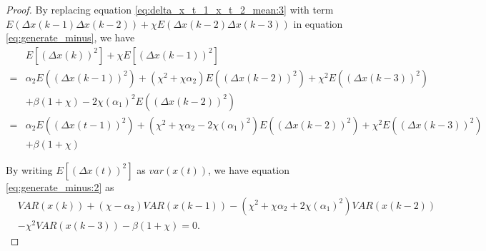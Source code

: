 \begin{proof}
By replacing equation \eqref{eq:delta_x_t_1_x_t_2_mean:3} with term $  E( \Delta x(k-1) \Delta x(k-2) ) + \chi E( \Delta x(k-2) \Delta x(k-3) )  $ in equation \eqref{eq:generate_minus}, we have
\begin{equation}
\label{eq:generate_minus:2}
\begin{aligned}
& E[ (\Delta x(k))^{2} ] + \chi E[ (\Delta x(k-1))^{2} ] \\
= & \alpha_{2} E( ( \Delta x(k-1) )^{2} ) + ( \chi^{2} + \chi \alpha_{2} ) E( ( \Delta x(k-2) )^{2} ) + \chi^{2} E( ( \Delta x(k-3) )^{2} ) \\
& + \beta (1 + \chi ) - 2 \chi ( \alpha_{1} )^{2}   E( ( \Delta x(k-2) )^{2} ) \\
= & \alpha_{2} E( ( \Delta x(t-1) )^{2} ) + ( \chi^{2} + \chi \alpha_{2} - 2 \chi ( \alpha_{1} )^{2} ) E( ( \Delta x(k-2) )^{2} ) + \chi^{2} E( ( \Delta x(k-3) )^{2} ) \\
& + \beta (1 + \chi ) 
\end{aligned}
\end{equation}

By writing $ E[ (\Delta x(t))^{2} ] $ as $ var(x(t)) $, we have equation \eqref{eq:generate_minus:2} as
\begin{equation}
\label{eq:generate_minus:3}
\begin{aligned}
& VAR(x(k)) + (\chi - \alpha_{2} ) VAR(x(k-1)) - ( \chi^{2} + \chi \alpha_{2} + 2 \chi ( \alpha_{1} )^{2} ) VAR(x(k-2)) \\
& - \chi^{2} VAR(x(k-3)) - \beta (1 + \chi ) = 0.
\end{aligned}
\end{equation}


\end{proof}